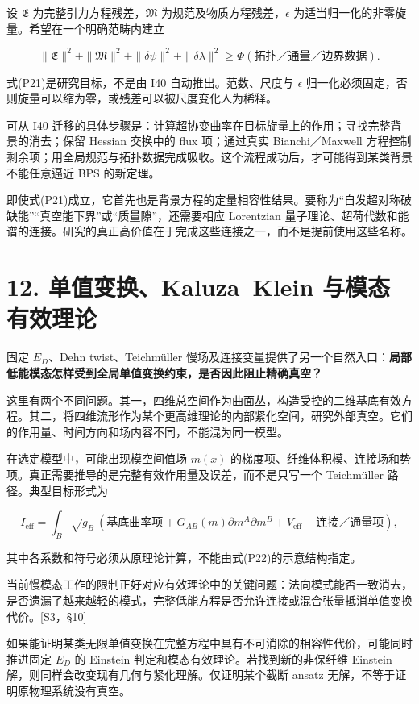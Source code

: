 \documentclass[UTF8,a4paper,11pt,fontset=fandol]{ctexart}
\begin{document}
设 \(\mathfrak E\) 为完整引力方程残差，\(\mathfrak M\)
为规范及物质方程残差，\(\epsilon\)
为适当归一化的非零旋量。希望在一个明确范畴内建立

\[
\|\mathfrak E\|^2+\|\mathfrak M\|^2
+\|\delta\psi\|^2+\|\delta\lambda\|^2
\ge\Phi(\text{拓扑／通量／边界数据}).
\tag{P21}
\]

式(P21)是研究目标，不是由 I40 自动推出。范数、尺度与 \(\epsilon\)
归一化必须固定，否则旋量可以缩为零，或残差可以被尺度变化人为稀释。

可从 I40
迁移的具体步骤是：计算超协变曲率在目标旋量上的作用；寻找完整背景的消去；保留
Hessian 交换中的 flux 项；通过真实 Bianchi／Maxwell
方程控制剩余项；用全局规范与拓扑数据完成吸收。这个流程成功后，才可能得到某类背景不能任意逼近
BPS 的新定理。

即使式(P21)成立，它首先也是背景方程的定量相容性结果。要称为``自发超对称破缺能''``真空能下界''或``质量隙''，还需要相应
Lorentzian
量子理论、超荷代数和能谱的连接。研究的真正高价值在于完成这些连接之一，而不是提前使用这些名称。

\section{12. 单值变换、Kaluza--Klein
与模态有效理论}\label{ux5355ux503cux53d8ux6362kaluzaklein-ux4e0eux6a21ux6001ux6709ux6548ux7406ux8bba}

固定 \(E_D\)、Dehn twist、Teichmüller
慢场及连接变量提供了另一个自然入口：\textbf{局部低能模态怎样受到全局单值变换约束，是否因此阻止精确真空？}

这里有两个不同问题。其一，四维总空间作为曲面丛，构造受控的二维基底有效方程。其二，将四维流形作为某个更高维理论的内部紧化空间，研究外部真空。它们的作用量、时间方向和场内容不同，不能混为同一模型。

在选定模型中，可能出现模空间值场 \(m(x)\)
的梯度项、纤维体积模、连接场和势项。真正需要推导的是完整有效作用量及误差，而不是只写一个
Teichmüller 路径。典型目标形式为

\[
I_{\mathrm{eff}}=
\int_B\sqrt{g_B}\,
\left(\text{基底曲率项}
+G_{AB}(m)\partial m^A\partial m^B
+V_{\mathrm{eff}}+\text{连接／通量项}\right),
\tag{P22}
\]

其中各系数和符号必须从原理论计算，不能由式(P22)的示意结构指定。

当前慢模态工作的限制正好对应有效理论中的关键问题：法向模式能否一致消去，是否遗漏了越来越轻的模式，完整低能方程是否允许连接或混合张量抵消单值变换代价。{[}S3，§10{]}

如果能证明某类无限单值变换在完整方程中具有不可消除的相容性代价，可能同时推进固定
\(E_D\) 的 Einstein 判定和模态有效理论。若找到新的非保纤维 Einstein
解，则同样会改变现有几何与紧化理解。仅证明某个截断 ansatz
无解，不等于证明原物理系统没有真空。
\end{document}
